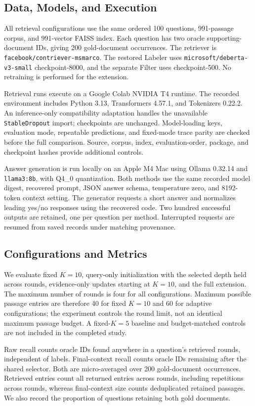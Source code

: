 \documentclass[conference]{IEEEtran}
\begin{document}
\subsection{Data, Models, and Execution}
All retrieval configurations use the same ordered 100 questions, 991-passage corpus, and 991-vector FAISS index. Each question has two oracle supporting-document IDs, giving 200 gold-document occurrences. The retriever is \texttt{facebook/contriever-msmarco}. The restored Labeler uses \texttt{microsoft/deberta-v3-small} checkpoint-8000, and the separate Filter uses checkpoint-500. No retraining is performed for the extension.

Retrieval runs execute on a Google Colab NVIDIA T4 runtime. The recorded environment includes Python 3.13, Transformers 4.57.1, and Tokenizers 0.22.2. An inference-only compatibility adaptation handles the unavailable \texttt{StableDropout} import; checkpoints are unchanged. Model-loading keys, evaluation mode, repeatable predictions, and fixed-mode trace parity are checked before the full comparison. Source, corpus, index, evaluation-order, package, and checkpoint hashes provide additional controls.

Answer generation is run locally on an Apple M4 Mac using Ollama 0.32.14 and \texttt{llama3:8b}, with Q4\_0 quantization. Both methods use the same recorded model digest, recovered prompt, JSON answer schema, temperature zero, and 8192-token context setting. The generator requests a short answer and normalizes leading yes/no responses using the recovered code. Two hundred successful outputs are retained, one per question per method. Interrupted requests are resumed from saved records under matching provenance.

\subsection{Configurations and Metrics}
We evaluate fixed $K=10$, query-only initialization with the selected depth held across rounds, evidence-only updates starting at $K=10$, and the full extension. The maximum number of rounds is four for all configurations. Maximum possible passage entries are therefore 40 for fixed $K=10$ and 60 for adaptive configurations; the experiment controls the round limit, not an identical maximum passage budget. A fixed-$K=5$ baseline and budget-matched controls are not included in the completed study.

Raw recall counts oracle IDs found anywhere in a question's retrieved rounds, independent of labels. Final-context recall counts oracle IDs remaining after the shared selector. Both are micro-averaged over 200 gold-document occurrences. Retrieved entries count all returned entries across rounds, including repetitions across rounds, whereas final-context size counts deduplicated retained passages. We also record the proportion of questions retaining both gold documents.
\end{document}
